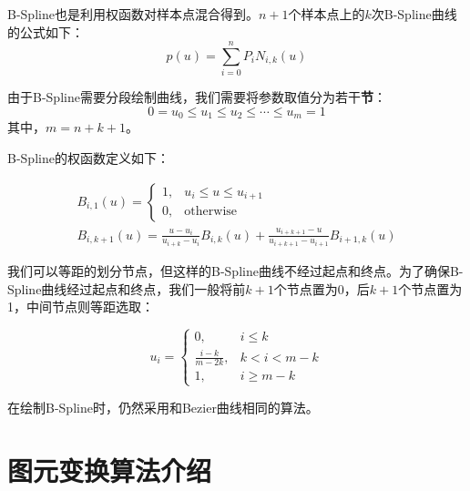 \documentclass[a4paper,12pt]{article}
\begin{document}
B-Spline也是利用权函数对样本点混合得到。$n+1$个样本点上的$k$次B-Spline曲线的公式如下：
$$ p(u) = \sum_{i=0}^n P_i N_{i, k}(u) $$

由于B-Spline需要分段绘制曲线，我们需要将参数取值分为若干\textbf{节}：
$$0 = u_0 \leq u_1 \leq u_2 \leq \cdots \leq u_m = 1$$
其中，$m = n + k + 1$。

B-Spline的权函数定义如下：

\begin{gather}
B_{i, 1}(u) = 
\begin{cases} 1, & u_i \leq u \leq u_{i+1} \\ 
              0, & \text{otherwise} 
\end{cases} \\
B_{i, k+1}(u) = \frac{u - u_i}{u_{i+k} - u_i} B_{i,k}(u) + 
	\frac{u_{i+k+1} - u}{u_{i+k+1} - u_{i+1}}B_{i+1, k}(u)
\end{gather}

我们可以等距的划分节点，但这样的B-Spline曲线不经过起点和终点。为了确保B-Spline曲线经过起点和终点，我们一般将前$k+1$个节点置为0，后$k+1$个节点置为1，中间节点则等距选取：

$$ u_i = \begin{cases}
0, & i \leq k \\
\frac{i - k}{m - 2k}, & k < i < m - k \\
1, & i \geq m - k
\end{cases}
$$

在绘制B-Spline时，仍然采用和Bezier曲线相同的算法。

\section{图元变换算法介绍}
\end{document}
